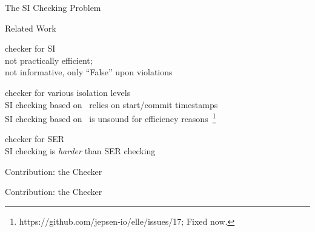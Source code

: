 \begin{frame}{The SI Checking Problem}
  \begin{center}
    

    \vspace{0.30cm}
  \end{center}
\end{frame}

\begin{frame}{Related Work}
  \begin{description}
    \setlength{\itemsep}{15pt}
    \item[dbcop~\ncite{Complexity:OOPSLA2019}] checker for SI \\[2pt]
      not practically efficient; \\[2pt]
      not informative, only ``\textsf{False}'' upon violations
    \pause
    \item[Elle~\ncite{Elle:VLDB2020}] checker for various isolation levels \\[2pt]
      SI checking based on~
      relies on start/commit timestamps \\[2pt]
      SI checking based on~
      is unsound for efficiency reasons~\footnote{https://github.com/jepsen-io/elle/issues/17; Fixed now.}
    \pause
    \item[Cobra~\ncite{Cobra:OSDI2020}] checker for SER \\[2pt]
      SI checking is {\it harder} than SER checking
  \end{description}
\end{frame}

\begin{frame}{Contribution: the \polysi{} Checker}
\end{frame}

\begin{frame}{Contribution: the \polysi{} Checker}
  \begin{center}
    

    \vspace{0.50cm}
  \end{center}
\end{frame}
